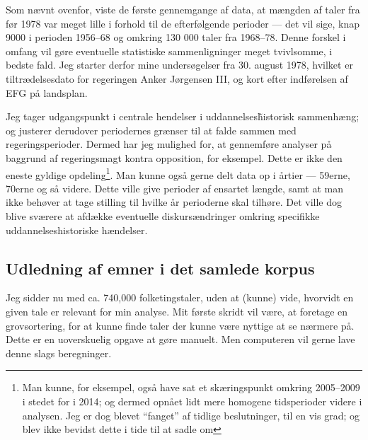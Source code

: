 Som nævnt ovenfor, viste de første gennemgange af data, at mængden af taler fra før 1978 var meget lille i forhold til de efterfølgende perioder — det vil sige, knap 9000 i perioden 1956--68 og omkring 130 000 taler fra 1968--78.
Denne forskel i omfang vil gøre eventuelle statistiske sammenligninger meget tvivlsomme, i bedste fald.
Jeg starter derfor mine undersøgelser fra 30. august 1978, hvilket er tiltrædelsesdato for regeringen Anker Jørgensen III, og kort efter indførelsen af EFG på landsplan.

Jeg tager udgangspunkt i centrale hendelser i uddannelses\~historisk sammenhæng; og justerer derudover periodernes grænser til at falde sammen med regeringsperioder.
Dermed har jeg mulighed for, at gennemføre analyser på baggrund af regeringsmagt kontra opposition, for eksempel.
Dette er ikke den eneste gyldige opdeling\footnote{Man kunne, for eksempel, også have sat et skæringspunkt omkring 2005--2009 i stedet for i 2014; og dermed opnået lidt mere homogene tidsperioder videre i analysen. Jeg er dog blevet “fanget” af tidlige beslutninger, til en vis grad; og blev ikke bevidst dette i tide til at sadle om}.
Man kunne også gerne delt data op i årtier — 59erne, 70erne og så videre.
Dette ville give perioder af ensartet længde, samt at man ikke behøver at tage stilling til hvilke år perioderne skal tilhøre.
Det ville dog blive sværere at afdække eventuelle diskursændringer omkring specifikke uddannelseshistoriske hændelser.

\subsection{Udledning af emner i det samlede korpus}

Jeg sidder nu med ca. 740,000 folketingstaler, uden at (kunne) vide, hvorvidt en given tale er relevant for min analyse.
Mit første skridt vil være, at foretage en grovsortering, for at kunne finde taler der kunne være nyttige at se nærmere på.
Dette er en uoverskuelig opgave at gøre manuelt.
Men computeren vil gerne lave denne slags beregninger.

